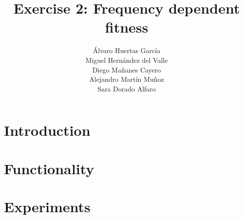\documentclass[11pt]{beamer}
\title[Frequency dependent fitness]{Exercise 2: Frequency dependent fitness}
\author[Group 5]{Álvaro Huertas García \\ Miguel Hernández del Valle \\ Diego Mañanes Cayero\\ 
                Alejandro Martín Muñoz \\Sara Dorado Alfaro }
\begin{document}
\frame{\titlepage}
\frame{\tableofcontents}

\section{Introduction} 


\section{Functionality}


\section{Experiments}



\frame{\titlepage}
\end{document}

